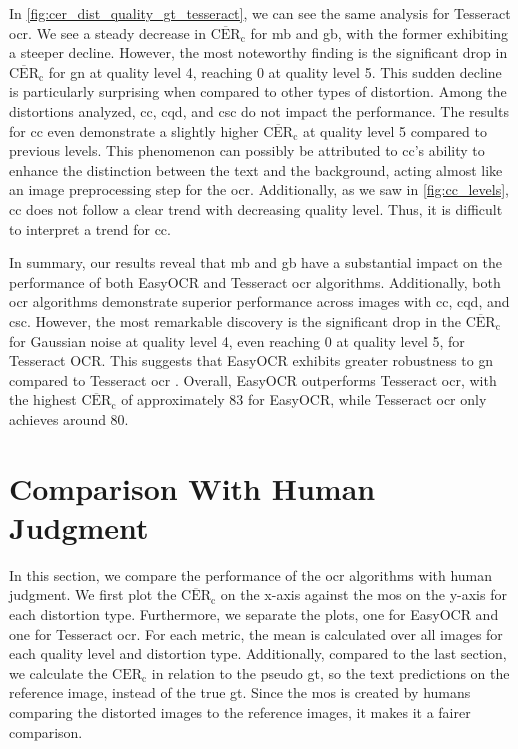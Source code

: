 In \autoref{fig:cer_dist_quality_gt_tesseract}, we can see the same analysis for Tesseract \gls{ocr}.
We see a steady decrease in $\overline{\text{CER}}_{\text{c}}$ for \gls{mb} and \gls{gb}, with the former exhibiting a steeper decline.
However, the most noteworthy finding is the significant drop in $\overline{\text{CER}}_{\text{c}}$ for \gls{gn} at quality level 4, reaching 0 at quality level 5.
This sudden decline is particularly surprising when compared to other types of distortion.
Among the distortions analyzed, \gls{cc}, \gls{cqd}, and \gls{csc} do not impact the performance.
The results for \gls{cc} even demonstrate a slightly higher $\overline{\text{CER}}_{\text{c}}$ at quality level 5 compared to previous levels.
This phenomenon can possibly be attributed to \gls{cc}'s ability to enhance the distinction between the text and the background, acting almost like an image preprocessing step for the \gls{ocr}.
Additionally, as we saw in \autoref{fig:cc_levels}, \gls{cc} does not follow a clear trend with decreasing quality level.
Thus, it is difficult to interpret a trend for \gls{cc}.

In summary, our results reveal that \gls{mb} and \gls{gb} have a substantial impact on the performance of both EasyOCR and Tesseract \gls{ocr} algorithms.
Additionally, both \gls{ocr} algorithms demonstrate superior performance across images with \gls{cc}, \gls{cqd}, and \gls{csc}.
However, the most remarkable discovery is the significant drop in the $\overline{\text{CER}}_{\text{c}}$ for Gaussian noise at quality level 4, even reaching 0 at quality level 5, for Tesseract OCR.
This suggests that EasyOCR exhibits greater robustness to \gls{gn} compared to Tesseract \gls{ocr} .
Overall, EasyOCR outperforms Tesseract \gls{ocr}, with the highest $\overline{\text{CER}}_{\text{c}}$ of approximately 83 for EasyOCR, while Tesseract \gls{ocr} only achieves around 80.




\section{Comparison With Human Judgment}
\label{sec:comparison_with_human_judgment}

In this section, we compare the performance of the \gls{ocr} algorithms with human judgment.
We first plot the $\overline{\text{CER}}_{\text{c}}$ on the x-axis against the \gls{mos} on the y-axis for each distortion type.
Furthermore, we separate the plots, one for EasyOCR and one for Tesseract \gls{ocr}.
For each metric, the mean is calculated over all images for each quality level and distortion type.
Additionally, compared to the last section, we calculate the $\text{CER}_{\text{c}}$ in relation to the pseudo \gls{gt}, so the text predictions on the reference image, instead of the true \gls{gt}.
Since the \gls{mos} is created by humans comparing the distorted images to the reference images, it makes it a fairer comparison.

